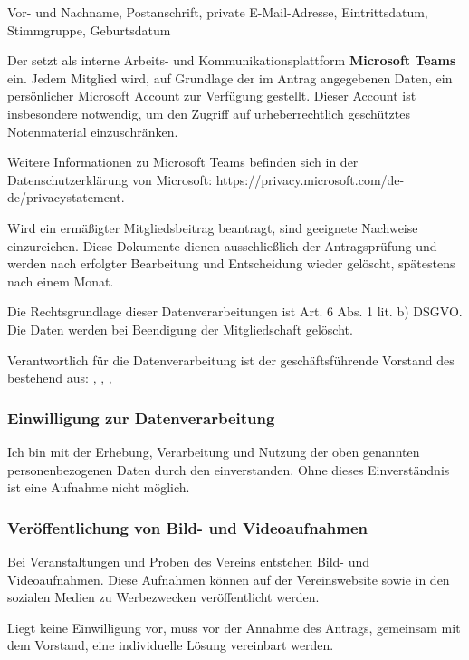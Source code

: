 \documentclass[parskip=half]{scrreprt}
\def\cb#1{\CheckBox[name=#1,height=0.5cm,width=0.5cm,bordercolor=black]{\null}}
\begin{document}
\begin{Form}
\vspace{-0.5cm}
Vor- und Nachname, Postanschrift, private E-Mail-Adresse, Eintrittsdatum, Stimmgruppe, Geburtsdatum

Der \verein setzt als interne Arbeits- und Kommunikationsplattform \textbf{Microsoft Teams} ein.
Jedem Mitglied wird, auf Grundlage der im Antrag angegebenen Daten, ein persönlicher Microsoft Account zur Verfügung gestellt.
Dieser Account ist insbesondere notwendig, um den Zugriff auf urheberrechtlich geschütztes Notenmaterial einzuschränken.

Weitere Informationen zu Microsoft Teams befinden sich in der Datenschutzerklärung von
Microsoft: {\color{ci_blue}https://privacy.microsoft.com/de-de/privacystatement}.

Wird ein ermäßigter Mitgliedsbeitrag beantragt, sind geeignete Nachweise einzureichen. Diese Dokumente dienen ausschließlich der Antragsprüfung und werden nach erfolgter Bearbeitung und Entscheidung wieder gelöscht, spätestens nach einem Monat.

Die Rechtsgrundlage dieser Datenverarbeitungen ist Art. 6 Abs. 1 lit. b) DSGVO. Die Daten werden bei Beendigung der Mitgliedschaft gelöscht.

Verantwortlich für die Datenverarbeitung ist der geschäftsführende Vorstand des \verein bestehend aus: \vorstandvorsitz, \vorstandvorsitzstv, \vorstandkasse, \vorstandschrift

\vspace{-0.5cm}
\subsubsection*{Einwilligung zur Datenverarbeitung}

\cb{cb_datenschutz} Ich bin mit der Erhebung, Verarbeitung und Nutzung der oben genannten personenbezogenen Daten durch den \verein einverstanden. Ohne dieses Einverständnis ist eine Aufnahme nicht möglich.

\vspace{-0.5cm}
\subsubsection*{Veröffentlichung von Bild- und Videoaufnahmen}

Bei Veranstaltungen und Proben des Vereins entstehen Bild- und Videoaufnahmen. Diese Aufnahmen können auf der Vereinswebsite sowie in den sozialen Medien zu Werbezwecken veröffentlicht werden.

Liegt keine Einwilligung vor, muss vor der Annahme des Antrags, gemeinsam mit dem Vorstand, eine individuelle Lösung vereinbart werden.


\end{Form}
\end{document}
